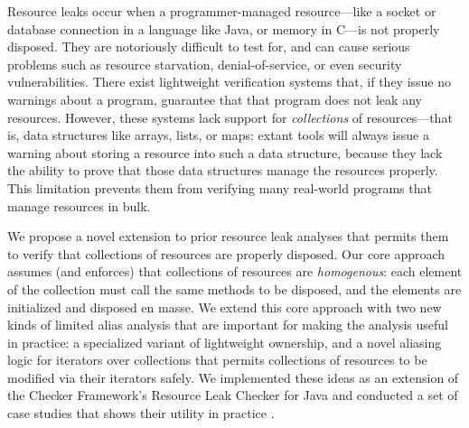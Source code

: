 Resource leaks occur when a programmer-managed resource---like a socket or
database connection in a language like Java, or memory in C---is not properly disposed.
They are notoriously difficult to test for, and can cause serious problems such
as resource starvation, denial-of-service, or even security vulnerabilities.
There exist lightweight verification systems that, if they issue no
warnings about a program, guarantee that that program does not leak any resources.
However, these systems lack support for \emph{collections} of resources---that is,
data structures like arrays, lists, or maps: extant tools will always issue a warning
about storing a resource into such a data structure, because they lack the ability to
prove that those data structures manage the resources properly. This limitation
prevents them from verifying many real-world programs that manage resources in bulk.

We propose a novel extension to prior resource leak analyses that permits them to verify
that collections of resources are properly disposed. Our core approach assumes (and enforces) that
collections of resources are \emph{homogenous}: each element of the collection must call
the same methods to be disposed, and the elements are initialized and disposed en masse.
We extend this core approach with two new kinds of limited alias analysis that are important
for making the analysis useful in practice: a specialized variant of lightweight ownership,
and a novel aliasing logic for iterators over collections that permits collections of resources
to be modified via their iterators safely. We implemented these ideas as an extension of
the Checker Framework's Resource Leak Checker for Java and conducted a set of case studies that shows
their utility in practice .

\label{dummy-label-for-etags:abstract}
